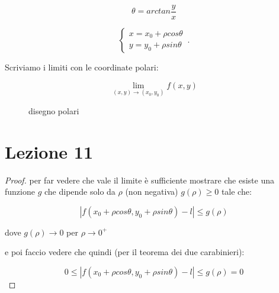 \documentclass[11pt]{article}
\begin{document}
\[
    \theta = arctan \frac{y}{x}
\]

\begin{equation}
    \begin{cases}
           x= x_0+ \rho cos \theta\\
           y = y_0+ \rho sin \theta
    \end{cases}\,.
\end{equation}

Scriviamo i limiti con le coordinate polari:

\[
    \lim_{ (x,y) \to (x_0,y_0) } f(x,y)
\]

\begin{figure}[ht]
    \centering
    \caption{disegno polari}
    \label{fig:disegno-polari}
\end{figure}


\newpage

\section{Lezione 11}


\begin{proof}
       per far vedere che vale il limite è sufficiente mostrare che esiste una funzione $g$ che dipende solo da $\rho$ (non negativa) $g(\rho)\ge 0$ tale che:

       \[
        |f(x_0+\rho cos\theta, y_0+\rho sin \theta ) -l| \le  g(\rho)
       \]

       dove $g(\rho) \rightarrow 0$ per $\rho \rightarrow 0^{+}$

       e poi faccio vedere che quindi (per il teorema dei due carabinieri):

       \[
        0\le |f(x_0+\rho cos\theta, y_0+\rho sin \theta ) -l| \le  g(\rho) = 0
       \]

\end{proof}
\end{document}
